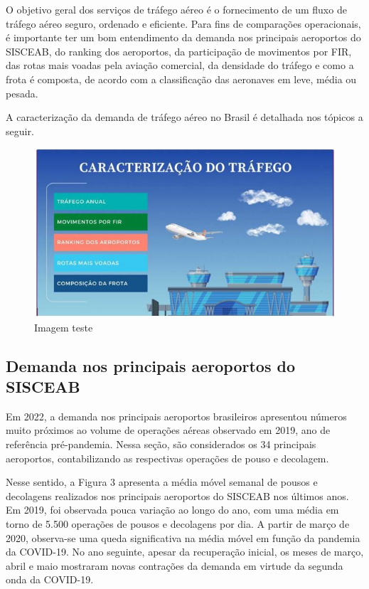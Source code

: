 \documentclass[
]{book}
\theoremstyle{definition}
\theoremstyle{definition}
\theoremstyle{definition}
\theoremstyle{definition}
\theoremstyle{remark}
\begin{document}
O objetivo geral dos serviços de tráfego aéreo é o fornecimento de um fluxo de tráfego aéreo seguro, ordenado e eficiente. Para fins de comparações operacionais, é importante ter um bom entendimento da demanda nos principais aeroportos do SISCEAB, do ranking dos aeroportos, da participação de movimentos por FIR, das rotas mais voadas pela aviação comercial, da densidade do tráfego e como a frota é composta, de acordo com a classificação das aeronaves em leve, média ou pesada.

A caracterização da demanda de tráfego aéreo no Brasil é detalhada nos tópicos a seguir.

\begin{figure}
\centering
\includegraphics{imagens/fig12.jpg}
\caption{Imagem teste}
\end{figure}

\hypertarget{demanda-nos-principais-aeroportos-do-sisceab}{%
\subsection{Demanda nos principais aeroportos do SISCEAB}\label{demanda-nos-principais-aeroportos-do-sisceab}}

Em 2022, a demanda nos principais aeroportos brasileiros apresentou números muito próximos ao volume de operações aéreas observado em 2019, ano de referência pré-pandemia. Nessa seção, são considerados os 34 principais aeroportos, contabilizando as respectivas operações de pouso e decolagem.

Nesse sentido, a Figura 3 apresenta a média móvel semanal de pousos e decolagens realizados nos principais aeroportos do SISCEAB nos últimos anos. Em 2019, foi observada pouca variação ao longo do ano, com uma média em torno de 5.500 operações de pousos e decolagens por dia. A partir de março de 2020, observa-se uma queda significativa na média móvel em função da pandemia da COVID-19. No ano seguinte, apesar da recuperação inicial, os meses de março, abril e maio mostraram novas contrações da demanda em virtude da segunda onda da COVID-19.
\end{document}
